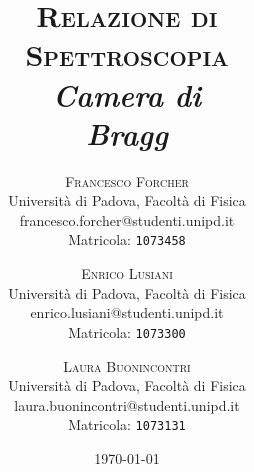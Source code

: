 \title{
\vspace{-2cm}
\fontsize{48pt}{10pt}\selectfont
\textsc{Relazione di \\[3mm] Spettroscopia} \\[8mm] 
\fontsize{24pt}{10pt}\selectfont
\textit{Camera di\\[3mm] Bragg}
}
\author{
\large
\textsc{Francesco Forcher}\\[2mm]
\normalsize Università di Padova, Facoltà di Fisica\\
\normalsize francesco.forcher@studenti.unipd.it\\
\normalsize Matricola: \texttt{1073458}\\
\and
\large
\textsc{Enrico Lusiani}\\[2mm]
\normalsize Università di Padova, Facoltà di Fisica\\
\normalsize enrico.lusiani@studenti.unipd.it\\
\normalsize Matricola: \texttt{1073300}\\
\and
\large
\textsc{Laura Buonincontri}\\[2mm]
\normalsize Università di Padova, Facoltà di Fisica\\
\normalsize laura.buonincontri@studenti.unipd.it\\
\normalsize Matricola: \texttt{1073131}
}
\date{\today}
